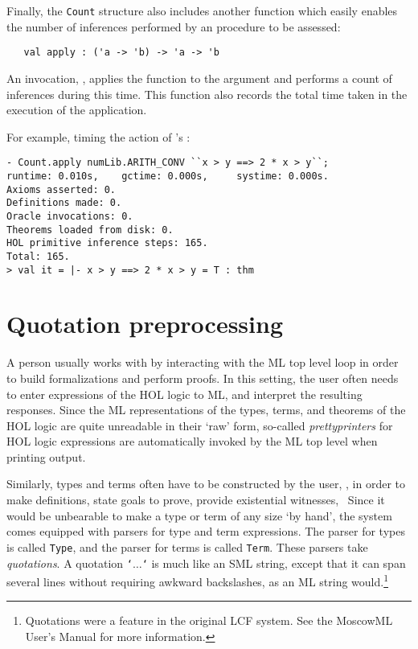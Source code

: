 Finally, the \texttt{Count} structure also includes another function
which easily enables the number of inferences performed by an \ML{}
procedure to be assessed:

\begin{boxed}
\begin{verbatim}
   val apply : ('a -> 'b) -> 'a -> 'b
\end{verbatim}
\end{boxed}

An invocation, , applies the function  to
the argument  and performs a count of inferences during this
time.  This function also records the total time taken in the
execution of the application.

For example, timing the action of 's :

\setcounter{sessioncount}{1}
\begin{session}
\begin{verbatim}
- Count.apply numLib.ARITH_CONV ``x > y ==> 2 * x > y``;
runtime: 0.010s,    gctime: 0.000s,     systime: 0.000s.
Axioms asserted: 0.
Definitions made: 0.
Oracle invocations: 0.
Theorems loaded from disk: 0.
HOL primitive inference steps: 165.
Total: 165.
> val it = |- x > y ==> 2 * x > y = T : thm
\end{verbatim}
\end{session}



\section{Quotation preprocessing}

A person usually works with \holn{} by interacting with the ML top level
loop in order to build formalizations and perform proofs. In this
setting, the user often needs to enter expressions of the HOL logic to
ML, and interpret the resulting responses. Since the ML representations
of the types, terms, and theorems of the HOL logic are quite unreadable
in their `raw' form, so-called {\it prettyprinters\/} for HOL logic
expressions are automatically invoked by the ML top level when printing
output.

Similarly, types and terms often have to be constructed by the user,
\eg, in order to make definitions, state goals to prove, provide
existential witnesses, \etc\ Since it would be unbearable to make a type
or term of any size `by hand', the system comes equipped with parsers
for type and term expressions. The parser for types is called
\verb+Type+, and the parser for terms is called \verb+Term+. These
parsers take {\it quotations\/}.  A quotation \mbox{{\tt `}$\ldots${\tt `}} is
much like an SML string, except that it can span several lines without
requiring awkward backslashes, as an ML string
would.\footnote{Quotations were a feature in the original LCF
system. See the MoscowML User's Manual for more information.}

